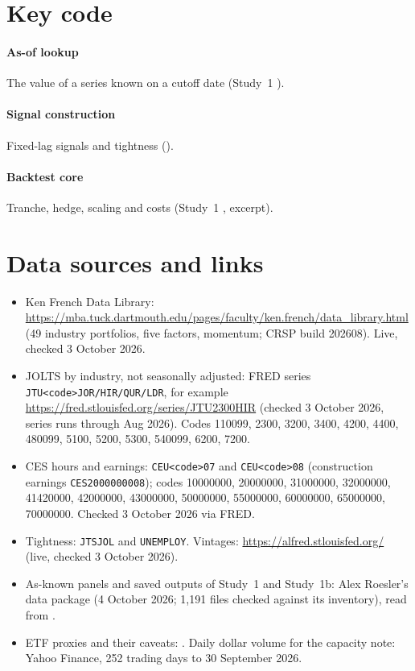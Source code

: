 \section{Key code}\label{app:code}
\paragraph{As-of lookup} The value of a series known on a cutoff date (Study~1 ).

\paragraph{Signal construction} Fixed-lag signals and tightness ().

\paragraph{Backtest core} Tranche, hedge, scaling and costs (Study~1 , excerpt).


\section{Data sources and links}\label{app:data}
\begin{itemize}
  \item Ken French Data Library: \url{https://mba.tuck.dartmouth.edu/pages/faculty/ken.french/data_library.html} (49 industry portfolios, five factors, momentum; CRSP build 202608). Live, checked 3 October 2026.
  \item JOLTS by industry, not seasonally adjusted: FRED series \texttt{JTU<code>JOR/HIR/QUR/LDR}, for example \url{https://fred.stlouisfed.org/series/JTU2300HIR} (checked 3 October 2026, series runs through Aug 2026). Codes 110099, 2300, 3200, 3400, 4200, 4400, 480099, 5100, 5200, 5300, 540099, 6200, 7200.
  \item CES hours and earnings: \texttt{CEU<code>07} and \texttt{CEU<code>08} (construction earnings \texttt{CES2000000008}); codes 10000000, 20000000, 31000000, 32000000, 41420000, 42000000, 43000000, 50000000, 55000000, 60000000, 65000000, 70000000. Checked 3 October 2026 via FRED.
  \item Tightness: \texttt{JTSJOL} and \texttt{UNEMPLOY}. Vintages: \url{https://alfred.stlouisfed.org/} (live, checked 3 October 2026).
  \item As-known panels and saved outputs of Study~1 and Study~1b: Alex Roesler's data package (4 October 2026; 1,191 files checked against its inventory), read from .
  \item ETF proxies and their caveats: . Daily dollar volume for the capacity note: Yahoo Finance, 252 trading days to 30 September 2026.
\end{itemize}

